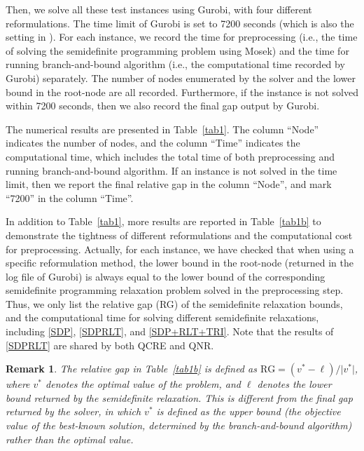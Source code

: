 \documentclass[pdflatex,sn-mathphys-num]{sn-jnl}%
\theoremstyle{thmstyleone}%
\theoremstyle{thmstyletwo}%
\newtheorem{remark}{Remark}%
\theoremstyle{thmstylethree}%
\begin{document}
Then, we solve all these test instances using Gurobi, with four different reformulations. The time limit of Gurobi is set to 7200 seconds (which is also the setting in \cite{Locatelli2024}). For each instance, we record the time for preprocessing (i.e., the time of solving the semidefinite programming problem using Mosek) and the time for running branch-and-bound algorithm (i.e., the computational time recorded by Gurobi) separately. The number of nodes enumerated by the solver and the lower bound in the root-node are all recorded. Furthermore, if the instance is not solved within 7200 seconds, then we also record the final gap output by Gurobi.

The numerical results are presented in Table~\ref{tab1}. The column ``Node'' indicates the number of nodes, and the column ``Time'' indicates the computational time, which includes the total time of both preprocessing and running branch-and-bound algorithm. If an instance is not solved in the time limit, then we report the final relative gap in the column ``Node'', and mark ``7200'' in the column ``Time''.

In addition to Table~\ref{tab1}, more results are reported in Table~\ref{tab1b} to demonstrate the tightness of different reformulations and the computational cost for preprocessing. Actually, for each instance, we have checked that when using a specific reformulation method, the lower bound in the root-node (returned in the log file of Gurobi) is always equal to the lower bound of the corresponding semidefinite programming relaxation problem solved in the preprocessing step. Thus, we only list the relative gap (RG) of the semidefinite relaxation bounds, and the computational time for solving different semidefinite relaxations, including \eqref{SDP}, \eqref{SDPRLT}, and \eqref{SDP+RLT+TRI}. Note that the results of \eqref{SDPRLT} are shared by  both QCRE and QNR.

\begin{remark}
	The relative gap in Table~\ref{tab1b} is defined as $\textrm{RG}=(v^\ast-\ell)/\vert v^\ast \vert$, where $v^\ast$ denotes the optimal value of the problem, and $\ell$ denotes the lower bound returned by the semidefinite relaxation. This is different from the final gap returned by the solver, in which $v^\ast$ is defined as the upper bound (the objective value of the best-known solution, determined by the branch-and-bound algorithm) rather than the optimal value.
\end{remark}
\end{document}
